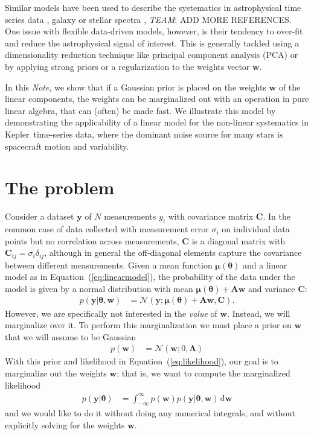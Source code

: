 \documentclass[modern]{rnaastex}
\newcommand{\project}[1]{\textsf{#1}}
\newcommand{\kepler}{\project{Kepler}}
\newcommand{\documentname}{\textsl{Note}}
\renewcommand{\eqref}[1]{\ref{eq:#1}}
\newcommand{\Eq}[1]{Equation~(\eqref{#1})}
\newcommand{\eq}[1]{\Eq{#1}}
\newcommand{\eqlabel}[1]{\label{eq:#1}}
\newcommand{\todo}[3]{{\color{#2}\emph{#1}: #3}}
\newcommand{\alltodo}[1]{\todo{TEAM}{red}{#1}}
\newcommand{\dd}{\ensuremath{\,\mathrm{d}}}
\newcommand{\bvec}[1]{{\ensuremath{\boldsymbol{#1}}}}
\newcommand{\Normal}{\ensuremath{\mathcal{N}}}
\newcommand{\mA}{\ensuremath{\bvec{A}}}
\newcommand{\mC}{\ensuremath{\bvec{C}}}
\newcommand{\mL}{\ensuremath{\bvec{\Lambda}}}
\newcommand{\vw}{\ensuremath{\bvec{w}}}
\newcommand{\vy}{\ensuremath{\bvec{y}}}
\newcommand{\vt}{\ensuremath{\bvec{\theta}}}
\newcommand{\vm}{\ensuremath{\bvec{\mu}(\bvec{\theta})}}
\begin{document}
Similar models have been used to describe the systematics in astrophysical time
series data \citep{Smith:2012, Wang:2016, Luger:2016}, galaxy or stellar spectra
\citep{Tsalmantza:2012, Ness:2015}, \alltodo{ADD MORE REFERENCES}.
One issue with flexible data-driven models, however, is their tendency to
over-fit and reduce the astrophysical signal of interest.
This is generally tackled using a dimensionality reduction technique like
principal component analysis (PCA) or by applying strong priors or a
regularization to the weights vector $\vw$.

In this \documentname, we show that if a
Gaussian prior is placed on the weights $\vw$ of the linear
components, the weights can be marginalized out with an operation in pure linear
algebra, that can (often) be made fast.
We illustrate this model by demonstrating the applicability of a linear model
for the non-linear systematics in \kepler\ time-series data, where the dominant
noise source for many stars is spacecraft motion and variability.

\section{The problem}

Consider a dataset $\vy$ of $N$ measurements $y_i$ with covariance
matrix $\mC$.
In the common case of data collected with measurement error $\sigma_i$ on
individual data points but no correlation across measurements, $\mC$ is a
diagonal matrix with $\mC_{ij} = \sigma_{i}\delta_{ij}$, although in general
the off-diagonal elements capture the covariance between different
measurements. Given a mean function $\vm$  and a linear model as in
\eq{linearmodel}, the probability of the data under the model is given by a
normal distribution with mean $\vm + \mA \vw$ and variance $\mC$:
%
\begin{align}\eqlabel{likelihood}
p(\vy | \vt, \vw) &= \Normal(\vy; \vm + \mA \vw, \mC).
\end{align}
%
However, we are specifically not interested in the \emph{value} of $\vw$.
Instead, we will marginalize over it.
To perform this marginalization we must place a prior on $\vw$ that we will
assume to be Gaussian
%
\begin{align}
p(\vw) &= \Normal(\vw; 0, \mL) \nonumber
\end{align}
%
With this prior and likelihood in \eq{likelihood}, our goal is to marginalize
out the weights $\vw$; that is, we want to compute the marginalized
likelihood
%
\begin{align}
p(\vy | \vt) &= \int_{-\infty}^{\infty} p(\vw) p(\vy | \vt, \vw) \dd\vw
\end{align}
and we would like to do it without doing any numerical integrals, and without
explicitly solving for the weights $\vw$.
\end{document}
